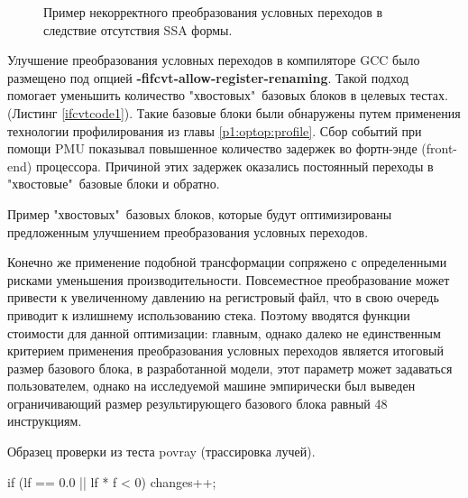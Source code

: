 \begin{figure}[htbp]
	\centering

	
	\caption{Пример некорректного преобразования условных переходов в следствие отсутствия SSA формы.}
	\label{fig:ifcvtsvg1}
\end{figure}

Улучшение преобразования условных переходов в компиляторе GCC было размещено под опцией \mbox{\textbf{-fifcvt-allow-register-renaming}}. Такой подход помогает уменьшить количество "хвостовых"\   базовых блоков в целевых тестах. (Листинг \ref{ifcvtcode1}). Такие базовые блоки были обнаружены путем применения технологии профилирования из главы \ref{p1:optop:profile}. Сбор событий при помощи PMU показывал повышенное количество задержек во фортн-энде (front-end) процессора. Причиной этих задержек оказались постоянный переходы в "хвостовые"\   базовые блоки и обратно.


\begin{ListingEnv}[!h]
	\captiondelim{ } %
		\caption{Пример "хвостовых"\  базовых блоков, которые будут оптимизированы предложенным улучшением преобразования условных переходов.}
	\label{ifcvtcode1}
\end{ListingEnv}

Конечно же применение подобной трансформации сопряжено с определенными рисками уменьшения производительности. Повсеместное преобразование может привести к увеличенному давлению на регистровый файл, что в свою очередь приводит к излишнему использованию стека. Поэтому вводятся функции стоимости для данной оптимизации: главным, однако далеко не единственным критерием применения преобразования условных переходов является итоговый размер базового блока, в  разработанной модели, этот параметр может задаваться пользователем, однако на исследуемой машине эмпирически был выведен  ограничивающий размер  результирующего базового блока равный 48 инструкциям.
\begin{ListingEnv}[!h]
	\captiondelim{ } %
	\caption{Образец проверки из теста povray (трассировка лучей).}
	\label{ifcvtcode2}
	\begin{Verb}
		if (lf == 0.0 || lf * f < 0)
		{
			changes++;
		} 
	\end{Verb}
\end{ListingEnv}


